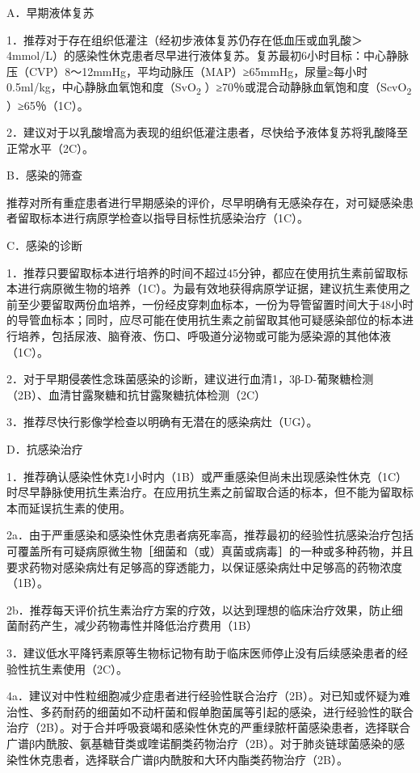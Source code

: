 A．早期液体复苏

1．推荐对于存在组织低灌注（经初步液体复苏仍存在低血压或血乳酸＞4mmol/L）的感染性休克患者尽早进行液体复苏。复苏最初6小时目标：中心静脉压（CVP）8～12mmHg，平均动脉压（MAP）≥65mmHg，尿量≥每小时0.5ml/kg，中心静脉血氧饱和度（SvO\textsubscript{2}
）≥70％或混合动静脉血氧饱和度（ScvO\textsubscript{2} ）≥65％（1C）。

2．建议对于以乳酸增高为表现的组织低灌注患者，尽快给予液体复苏将乳酸降至正常水平（2C）。

B．感染的筛查

推荐对所有重症患者进行早期感染的评价，尽早明确有无感染存在，对可疑感染患者留取标本进行病原学检查以指导目标性抗感染治疗（1C）。

C．感染的诊断

1．推荐只要留取标本进行培养的时间不超过45分钟，都应在使用抗生素前留取标本进行病原微生物的培养（1C）。为最有效地获得病原学证据，建议抗生素使用之前至少要留取两份血培养，一份经皮穿刺血标本，一份为导管留置时间大于48小时的导管血标本；同时，应尽可能在使用抗生素之前留取其他可疑感染部位的标本进行培养，包括尿液、脑脊液、伤口、呼吸道分泌物或可能为感染源的其他体液（1C）。

2．对于早期侵袭性念珠菌感染的诊断，建议进行血清1，3β-D-葡聚糖检测（2B）、血清甘露聚糖和抗甘露聚糖抗体检测（2C）

3．推荐尽快行影像学检查以明确有无潜在的感染病灶（UG）。

D．抗感染治疗

1．推荐确认感染性休克1小时内（1B）或严重感染但尚未出现感染性休克（1C）时尽早静脉使用抗生素治疗。在应用抗生素之前留取合适的标本，但不能为留取标本而延误抗生素的使用。

2a．由于严重感染和感染性休克患者病死率高，推荐最初的经验性抗感染治疗包括可覆盖所有可疑病原微生物［细菌和（或）真菌或病毒］的一种或多种药物，并且要求药物对感染病灶有足够高的穿透能力，以保证感染病灶中足够高的药物浓度（1B）。

2b．推荐每天评价抗生素治疗方案的疗效，以达到理想的临床治疗效果，防止细菌耐药产生，减少药物毒性并降低治疗费用（1B）

3．建议低水平降钙素原等生物标记物有助于临床医师停止没有后续感染患者的经验性抗生素使用（2C）。

4a．建议对中性粒细胞减少症患者进行经验性联合治疗（2B）。对已知或怀疑为难治性、多药耐药的细菌如不动杆菌和假单胞菌属等引起的感染，进行经验性的联合治疗（2B）。对于合并呼吸衰竭和感染性休克的严重绿脓杆菌感染患者，选择联合广谱β内酰胺、氨基糖苷类或喹诺酮类药物治疗（2B）。对于肺炎链球菌感染的感染性休克患者，选择联合广谱β内酰胺和大环内酯类药物治疗（2B）。

